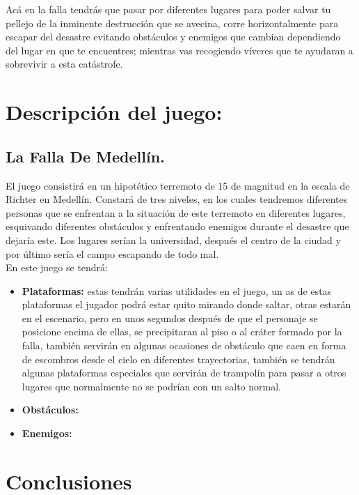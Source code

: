 \documentclass{article}
\begin{document}
Acá en la falla tendrás que pasar por diferentes lugares para poder salvar tu pellejo de la inminente destrucción que se avecina, corre horizontalmente para escapar del desastre evitando obstáculos y enemigos que cambian dependiendo del lugar en que te encuentres; mientras vas recogiendo víveres que te ayudaran a sobrevivir a esta catástrofe.


\section{Descripción del juego:}\label{descripcion}

\subsection{La Falla De Medellín.}

El juego consistirá en un hipotético terremoto de 15 de magnitud en la escala de Richter en Medellín. Constará de tres niveles, en los cuales tendremos diferentes personas que se enfrentan a la situación de este terremoto en diferentes lugares, esquivando diferentes obstáculos y enfrentando enemigos durante el desastre que dejaría este. Los lugares serían la universidad, después el centro de la ciudad y por último sería el campo escapando de todo mal.\\

En este juego se tendrá:

\begin{itemize}
    \item \textbf{Plataformas:} estas tendrán varias utilidades en el juego, un as de estas plataformas el jugador podrá estar quito mirando donde saltar, otras estarán en el escenario, pero en unos segundos después de que el personaje se posicione encima de ellas, se precipitaran al piso o al cráter formado por la falla, también servirán en algunas ocasiones de obstáculo que caen en forma de escombros desde el cielo en diferentes trayectorias, también se tendrán algunas plataformas especiales que servirán de trampolín para pasar a otros lugares que normalmente no se podrían con un salto normal.
    \item \textbf{Obstáculos:} 
    \item \textbf{Enemigos:} 

\end{itemize}

\section{Conclusiones} \label{conclusiones}



\end{document}
